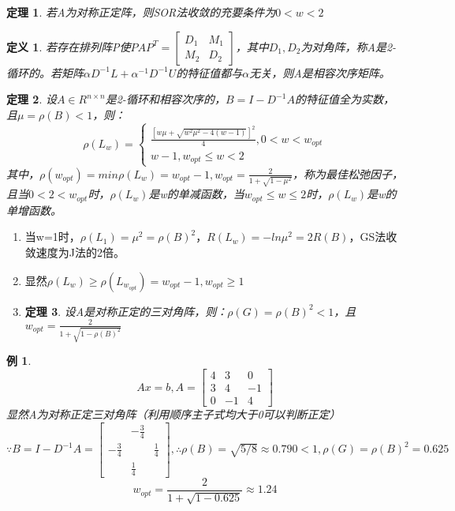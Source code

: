 \documentclass[a4paper]{article}
\newtheorem{definition}{定义}[section]
\newtheorem{theorem}{定理}[section]
\newtheorem{example}{例}[section]
\begin{document}
\begin{theorem}
  若A为对称正定阵，则SOR法收敛的充要条件为$0<w<2$
\end{theorem}

\begin{definition}
  若存在排列阵P使$PAP^T=\left[\begin{matrix}
    D_1 & M_1 \\
    M_2 & D_2
  \end{matrix}\right]$，其中$D_1, D_2$为对角阵，称A是2-循环的。若矩阵$\alpha D^{-1}L+\alpha^{-1}D^{-1}U $的特征值都与$\alpha$无关，则A是相容次序矩阵。
\end{definition}

\begin{theorem}
  设$A\in R^{n\times n} $是2-循环和相容次序的，$B=I-D^{-1}A $的特征值全为实数，且$\mu=\rho(B)<1$，则：
  \begin{equation*}
    \rho(L_w)=
    \left\{
      \begin{array}{lr}
        \frac{[w\mu+\sqrt{w^2\mu^2-4(w-1)}]^2}{4}, 0<w<w_{opt} \\
        w-1, w_{opt}\le w < 2
      \end{array}
      \right.
  \end{equation*}
  其中，$\rho(w_{opt})=min\rho(L_w)=w_{opt}-1, w_{opt}=\frac{2}{1+\sqrt{1-\mu^2}} $，称为最佳松弛因子，且当$0<2<w_{opt}$时，$\rho(L_w)$是w的单减函数，当$w_{opt}\le w\le 2$时，$\rho(L_w)$是w的单增函数。

\end{theorem}

\begin{enumerate}
  \item 当w=1时，$\rho(L_1)=\mu^2=\rho(B)^2$，$R(L_w)=-ln\mu^2=2R(B)$，GS法收敛速度为J法的2倍。
  \item 显然$\rho(L_w)\ge \rho(L_{w_{opt}})=w_{opt}-1, w_{opt}\ge 1 $
  \item \begin{theorem}
    设A是对称正定的三对角阵，则：$\rho(G)=\rho(B)^2<1$，且$w_{opt}=\frac{2}{1+\sqrt{1-\rho(B)^2}} $
  \end{theorem}
\end{enumerate}

\begin{example}
  $$Ax=b, A=\left[\begin{matrix}
    4 & 3 & 0 \\
    3 & 4 & -1 \\
    0 & -1 & 4
  \end{matrix}
    \right]$$
    显然A为对称正定三对角阵（利用顺序主子式均大于0可以判断正定） \\
    $\because B=I-D^{-1}A =\left[\begin{matrix}
      & -\frac{3}{4} \\
      -\frac{3}{4} & & \frac{1}{4} \\
      & \frac{1}{4} 
    \end{matrix}\right], \therefore \rho(B)=\sqrt{5/8}\approx 0.790 < 1,\rho(G)=\rho(B)^2=0.625$ \\
    $$w_{opt}=\frac{2}{1+\sqrt{1-0.625}}\approx 1.24$$
\end{example}
\end{document}

